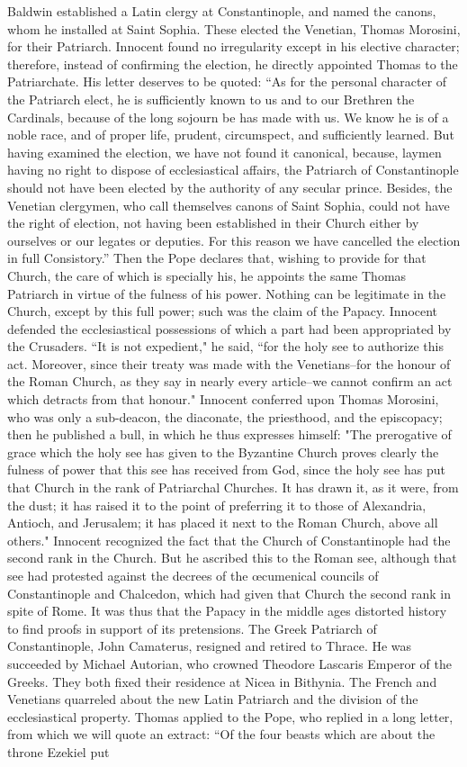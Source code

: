 Baldwin established a Latin clergy at Constantinople, and named the canons, whom he installed at Saint Sophia. These elected the Venetian, Thomas Morosini, for their Patriarch. Innocent found no irregularity except in his elective character; therefore, instead of confirming the election, he directly appointed Thomas to the Patriarchate. His letter deserves to be quoted: “As for the personal character of the Patriarch elect, he is sufficiently known to us and to our Brethren the Cardinals, because of the long sojourn be has made with us. We know he is of a noble race, and of proper life, prudent, circumspect, and sufficiently learned. But having examined the election, we have not found it canonical, because, laymen having no right to dispose of ecclesiastical affairs, the Patriarch of Constantinople should not have been elected by the authority of any secular prince. Besides, the Venetian clergymen, who call themselves canons of Saint Sophia, could not have the right of election, not having been established in their Church either by ourselves or our legates or deputies. For this reason we have cancelled the election in full Consistory.” Then the Pope declares that, wishing to provide for that Church, the care of which is specially his, he appoints the same Thomas Patriarch in virtue of the fulness of his power. Nothing can be legitimate in the Church, except by this full power; such was the claim of the Papacy. Innocent defended the ecclesiastical possessions of which a part had been appropriated by the Crusaders. “It is not expedient," he said, “for the holy see to authorize this act. Moreover, since their treaty was made with the Venetians--for the honour of the Roman Church, as they say in nearly every article--we cannot confirm an act which detracts from that honour." Innocent conferred upon Thomas Morosini, who was only a sub-deacon, the diaconate, the priesthood, and the episcopacy; then he published a bull, in which he thus expresses himself: "The prerogative of grace which the holy see has given to the Byzantine Church proves clearly the fulness of power that this see has received from God, since the holy see has put that Church in the rank of Patriarchal Churches. It has drawn it, as it were, from the dust; it has raised it to the point of preferring it to those of Alexandria, Antioch, and Jerusalem; it has placed it next to the Roman Church, above all others." Innocent recognized the fact that the Church of Constantinople had the second rank in the Church. But he ascribed this to the Roman see, although that see had protested against the decrees of the œcumenical councils of Constantinople and Chalcedon, which had given that Church the second rank in spite of Rome. It was thus that the Papacy in the middle ages distorted history to find proofs in support of its pretensions. The Greek Patriarch of Constantinople, John Camaterus, resigned and retired to Thrace. He was succeeded by Michael Autorian, who crowned Theodore Lascaris Emperor of the Greeks. They both fixed their residence at Nicea in Bithynia. The French and Venetians quarreled about the new Latin Patriarch and the division of the ecclesiastical property. Thomas applied to the Pope, who replied in a long letter, from which we will quote an extract: “Of the four beasts which are about the throne Ezekiel put 